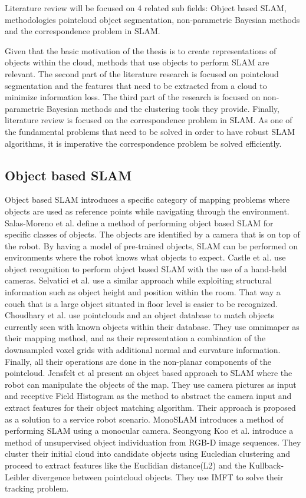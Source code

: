 \documentclass[twoside,hidelinks]{article}
\begin{document}
Literature review will be focused on 4 related sub fields: Object based SLAM, methodologies pointcloud object segmentation, non-parametric Bayesian methods and the correspondence problem in SLAM.

Given that the basic motivation of the thesis is to create representations of objects within the cloud, methods that use objects to perform SLAM are relevant. The second part of the literature research is focused on pointcloud segmentation and the features that need to be extracted from a cloud to minimize information loss. The third part of the research is focused on non-parametric Bayesian methods and the clustering tools they provide. Finally, literature review is focused on the correspondence problem in SLAM. As one of the fundamental problems that need to be solved in order to have robust SLAM algorithms, it is imperative the correspondence problem be solved efficiently. 

\subsection{Object based SLAM}


Object based SLAM introduces a specific category of mapping problems where objects are used as reference points while navigating through the environment.
Salas-Moreno et al.\cite{SLAM++} define a method of performing object based SLAM for specific classes of objects. The objects are identified by a camera that is on top of the robot. By having a model of pre-trained objects, SLAM can be performed on environments where the robot knows what objects to expect.
Castle et al. use object recognition to perform object based SLAM with the use of a hand-held cameras. Selvatici et al.\cite{objSLAM} use a similar approach while exploiting structural information such as object height and position within the room. That way a couch that is a large object situated in floor level is easier to be recognized.
Choudhary et al.\cite{objectpointSLAM} use pointclouds and an object database to match objects currently seen with known objects within their database. They use omnimaper\cite{omnimaper} as their mapping method, and as their representation a combination of the downsampled voxel grids with additional normal and curvature information.  Finally, all their operations are done in the non-planar components of the pointcloud.
Jensfelt et al\cite{objSLAM} present an object based approach to SLAM where the robot can manipulate the objects of the map. They use camera pictures as input and receptive Field Histogram as the method to abstract the camera input and extract features for their object matching algorithm. Their approach is proposed as a solution to a service robot scenario.
MonoSLAM\cite{monoSLAM} introduces a method of performing SLAM using a monocular camera. 
Seongyong Koo et al.\cite{objectDisc} introduce a method of unsupervised object individuation from RGB-D image sequences. They cluster their initial cloud into candidate objects using Eucledian clustering and proceed to extract features like the Euclidian distance(L2) and the Kullback-Leibler divergence between pointcloud objects. They use IMFT to solve their tracking problem.
\end{document}
